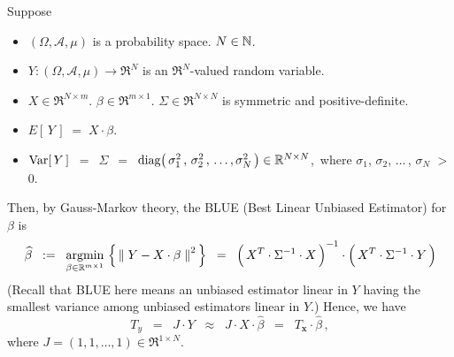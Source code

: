 \vskip 0.5cm
\begin{remark}
\mbox{}
\vskip 0.15cm
\noindent
Suppose
\begin{itemize}
\item
	$(\Omega,\mathcal{A},\mu)$ is a probability space.
	$N \in \mathbb{N}$.
\item
	$Y : (\Omega,\mathcal{A},\mu) \longrightarrow \Re^{N}$ is an $\Re^{N}$-valued random variable.
\item
	$X \in \Re^{N \times m}$.\;
	$\beta \in \Re^{m \times 1}$.\;
	$\Sigma \in \Re^{N \times N}$ is symmetric and positive-definite.
\item
	$E\!\left[\,Y\,\right] \; = \; X \cdot \beta$.
\item
	$\textnormal{Var}\!\left[\,Y\,\right]$
	\,$=$\, $\Sigma$
	\,$=$\, $\textnormal{diag}\!\left(\,\sigma_{1}^{2}\,,\,\sigma_{2}^{2}\,,\,\ldots,\sigma_{N}^{2}\,\right) \in \mathbb{R}^{N \times N}$,\,
	where $\sigma_{1}$, $\sigma_{2}$, $\ldots$\,, $\sigma_{N}$ $>$ $0$.
\end{itemize}
Then, by Gauss-Markov theory, the BLUE (Best Linear Unbiased Estimator) for $\beta$ is
\begin{equation*}
\widehat{\beta}
\;\; := \;\;
	\underset{\beta\in\Re^{m \times 1}}{\textnormal{argmin}}\,
	\left\{\,
		\left\Vert\;Y - X \cdot \beta\;\right\Vert^{2}
	\,\right\}
\;\; = \;\;
	\left(\,X^{T} \overset{{\color{white}!}}{\cdot} \Sigma^{-1} \cdot X\,\right)^{-1}
	\cdot
	\left(\,X^{T} \overset{{\color{white}!}}{\cdot} \Sigma^{-1} \cdot Y \,\right)
\end{equation*}
(Recall that BLUE here means an unbiased estimator linear in $Y$
having the smallest variance among unbiased estimators linear in $Y$.)
Hence, we have
\begin{equation}\label{TyEqTxBetaHat}
T_{y}
\;\; = \;\; J \cdot Y
\;\; \approx \;\; J \cdot X \cdot \widehat{\beta}
\;\; = \;\; T_{\mathbf{x}} \cdot \widehat{\beta}\,,
\end{equation}
where $J = (1,1,\ldots,1) \in \Re^{1 \times N}$.


\end{remark}
